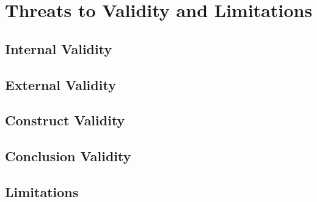 \chapter{Threats to Validity and Limitations}
\label{chap:threats}

\section{Internal Validity}
\label{sec:threats-internal}

\section{External Validity}
\label{sec:threats-external}

\section{Construct Validity}
\label{sec:threats-construct}

\section{Conclusion Validity}
\label{sec:threats-conclusion}

\section{Limitations}
\label{sec:limitations}
